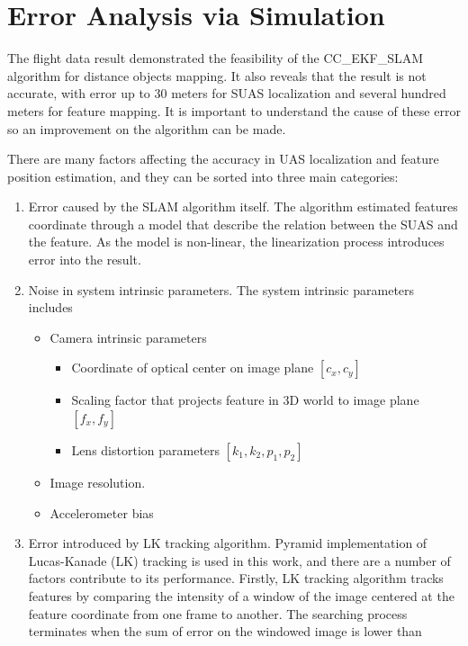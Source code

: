 \chapter{Error Analysis via Simulation}\label{ch:simulation}
The flight data result demonstrated the feasibility of the
CC\_EKF\_SLAM algorithm for distance objects mapping. It also reveals
that the result is not accurate, with error up to 30 meters for SUAS
localization and several hundred meters for feature mapping. It is
important to understand the cause of these error so an improvement on
the algorithm can be made. 

There are many factors affecting the accuracy in UAS localization and 
feature position estimation, and they can be sorted into three main 
categories: 

\begin{enumerate}
  \item Error caused by the SLAM algorithm itself. The algorithm
  estimated features coordinate through a model that describe the
  relation between the SUAS and the feature. As the model is
  non-linear, the linearization process introduces error into the
  result.
  \item Noise in system intrinsic parameters. The system intrinsic
  parameters includes
  \begin{itemize}
    \item Camera intrinsic parameters
    \begin{itemize}
      \item Coordinate of optical center on image plane $[c_{x}, c_{y}]$
      \item Scaling factor that projects feature in 3D world to image
      plane $ [f_{x}, f_{y}]$
      \item Lens distortion parameters $[k_{1}, k_{2}, p_{1}, p_{2}]$
    \end{itemize}
    \item Image resolution.
    \item Accelerometer bias 
  \end{itemize}
  \item Error introduced by LK tracking algorithm. Pyramid
  implementation of Lucas-Kanade (LK) tracking is used in this work,
  and there are a number of factors contribute to its performance.
  Firstly, LK tracking algorithm tracks features by comparing the
  intensity of a window of the image centered at the feature
  coordinate from one frame to another. The searching process
  terminates when the sum of error on the windowed image is lower than

\end{enumerate}
